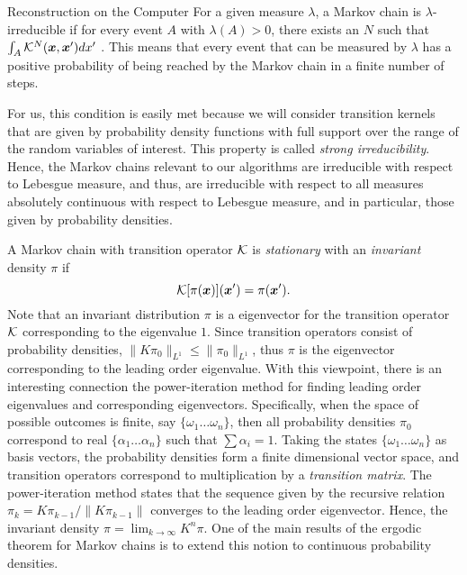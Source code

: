 \begin{chapter}{Reconstruction on the Computer}
For a given measure $\lambda$, a Markov chain is $\lambda$-irreducible if for every event $A$ with $\lambda(A) > 0$, there exists an $N$ such that $\int_A \mathcal K^N(\mbox{\boldmath$x$},\mbox{\boldmath$x$}')dx'$ \citep{robert2013monte}. 
This means that every event that can be measured by $\lambda$ has a positive probability of being reached by the Markov chain in a finite number of steps.

For us, this condition is easily met because we will consider transition kernels that are given by probability density functions with full support over the range of the random variables of interest. 
This property is called \emph{strong irreducibility}.
Hence, the Markov chains relevant to our algorithms are irreducible with respect to Lebesgue measure, and thus, are irreducible with respect to all measures absolutely continuous with respect to Lebesgue measure, and in particular, those given by probability densities.

A Markov chain with transition operator $\mathcal K$ is \emph{stationary} with an \emph{invariant} density $\pi$ if 
\begin{equation} \label{eq:stationarity}
  \mathcal K [\pi(\mbox{\boldmath$x$})](\mbox{\boldmath$x$}') = \pi(\mbox{\boldmath$x$}').
\end{equation}
Note that an invariant distribution $\pi$ is a eigenvector for the transition operator $\mathcal K$ corresponding to the eigenvalue $1$.
Since transition operators consist of probability densities, $\|K\pi_0\|_{L^1} \le \|\pi_0\|_{L^1}$, thus $\pi$ is the eigenvector corresponding to the leading order eigenvalue.
With this viewpoint, there is an interesting connection the power-iteration method for finding leading order eigenvalues and corresponding eigenvectors.
Specifically, when the space of possible outcomes is finite, say $\{\omega_1\dots \omega_n\}$, then all probability densities $\pi_0$ correspond to real $\{\alpha_1\dots\alpha_n\}$ such that $\sum\alpha_i = 1$.
Taking the states $\{\omega_1\dots \omega_n\}$ as basis vectors, the probability densities form a finite dimensional vector space, and transition operators correspond to multiplication by a \emph{transition matrix}.
The power-iteration method states that the sequence given by the recursive relation $\pi_k = K\pi_{k-1}/\|K\pi_{k-1}\|$ converges to the leading order eigenvector. 
Hence, the invariant density $\pi = \lim_{k\to \infty}K^n \pi$.
One of the main results of the ergodic theorem for Markov chains is to extend this notion to continuous probability densities.


\end{chapter}
